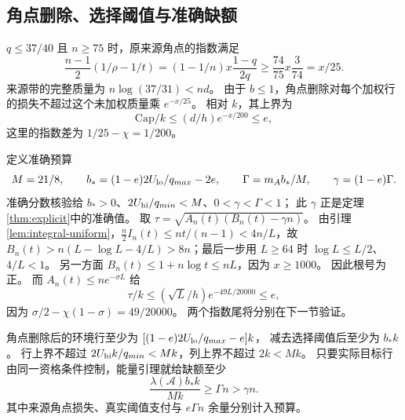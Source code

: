 \documentclass[UTF8,a4paper,11pt,fontset=fandol]{ctexart}
\theoremstyle{remark}
\begin{document}
\subsection{角点删除、选择阈值与准确缺额}\label{subsec:refined-budget}
$q\le37/40$ 且 $n\ge75$ 时，原来源角点的指数满足
\[
 \frac{n-1}{2}(1/\rho-1/t)
 =(1-1/n)x\frac{1-q}{2q}
 \ge\frac{74}{75}x\frac3{74}=x/25.
\]
来源带的完整质量为 $n\log(37/31)<nd$。
由于 $b\le1$，角点删除对每个加权行的损失不超过这个未加权质量乘 $e^{-x/25}$。
相对 $k$，其上界为
\begin{equation}\label{eq:cap-payment}
 \mathrm{Cap}/k\le(d/h)e^{-x/200}\le e,
\end{equation}
这里的指数差为 $1/25-\chi=1/200$。

定义准确预算
\begin{equation}\label{eq:refined-budget}
 M=21/8,\qquad b_*=(1-e)2U_{\rm lo}/q_{max}-2e,\qquad
 \Gamma=m_A b_*/M,\qquad\gamma=(1-e)\Gamma.
\end{equation}
准确分数核验给 $b_*>0$、$2U_{\rm hi}/q_{min}<M$、$0<\gamma<\Gamma<1$；
此 $\gamma$ 正是定理\ref{thm:explicit}中的准确值。
取 $\tau=\sqrt{A_n(t)(B_n(t)-\gamma n)}$。
由引理\ref{lem:integral-uniform}，$\frac n2I_n(t)\le nt/(n-1)<4n/L$，故
$B_n(t)>n(L-\log L-4/L)>8n$；最后一步用 $L\ge64$ 时 $\log L\le L/2$、$4/L<1$。
另一方面 $B_n(t)\le1+n\log t\le nL$，因为 $x\ge1000$。
因此根号为正。
而 $A_n(t)\le ne^{-\sigma L}$ 给
\begin{equation}\label{eq:tau-payment}
 \tau/k\le(\sqrt L/h)e^{-49L/20000}\le e,
\end{equation}
因为 $\sigma/2-\chi(1-\sigma)=49/20000$。
两个指数尾将分别在下一节验证。

角点删除后的环境行至少为 $[(1-e)2U_{\rm lo}/q_{max}-e]k$，
减去选择阈值后至少为 $b_*k$。
行上界不超过 $2U_{\rm hi}k/q_{min}<Mk$，列上界不超过 $2k<Mk$。
只要实际目标行由同一资格条件控制，能量引理就给缺额至少
\begin{equation}\label{eq:refined-deficit}
 \frac{\lambda(\mathcal A)b_*k}{Mk}\ge\Gamma n>\gamma n.
\end{equation}
其中来源角点损失、真实阈值支付与 $e\Gamma n$ 余量分别计入预算。
\end{document}
